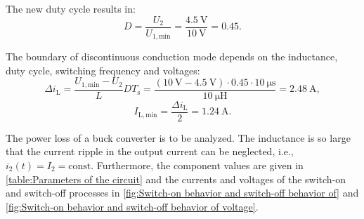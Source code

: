 \begin{solutionblock}
    The new duty cycle results in:
    \begin{equation}    
        D= \frac{U_\mathrm{2}}{U_{\mathrm{1,min}}} = \frac{\SI{4.5}{\volt}}{\SI{10}{\volt}} = 0.45.
    \end{equation}    
\end{solutionblock}

\begin{solutionblock}
    The boundary of discontinuous conduction mode depends on the inductance, duty cycle, switching frequency and voltages:
    \begin{equation}
        \Delta i_\mathrm{L} = \frac{U_{\mathrm{1,min}} - U_\mathrm{2}}{L} D T_\mathrm{s} = \frac{(\SI{10}{\volt} - \SI{4.5}{\volt}) \cdot 0.45 \cdot \SI{10}{\micro \second}}{\SI{10}{\micro \henry}} = \SI{2.48}{\ampere},
    \end{equation}
    \begin{equation}
        I_{\mathrm{L,min}} = \frac{\Delta i_\mathrm{L}}{2} = \SI{1.24}{\ampere}.
    \end{equation}
\end{solutionblock}







The power loss of a buck converter is to be analyzed. The inductance is so large
that the current ripple in the output current can be neglected, i.e., $ i_{\mathrm{2}}(t) = I_{\mathrm{2}} =\mathrm{const}$. Furthermore, the component values are given in \autoref{table:Parameters of the circuit} and the currents and voltages of the switch-on and switch-off processes in \autoref{fig:Switch-on behavior and switch-off behavior of} and \autoref{fig:Switch-on behavior and switch-off behavior of voltage}. 




